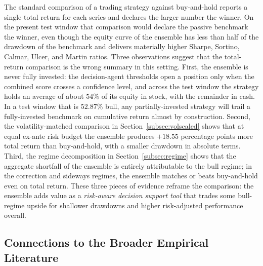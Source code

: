 \documentclass{ieeeaccess}
\newcommand{\VolScaledExcessPP}{\ensuremath{+18.55}}
\newcommand{\RegBullShare}{52.87\%}
\begin{document}
The standard comparison of a trading strategy against buy-and-hold reports a single total return for each series and declares the larger number the winner. On the present test window that comparison would declare the passive benchmark the winner, even though the equity curve of the ensemble has less than half of the drawdown of the benchmark and delivers materially higher Sharpe, Sortino, Calmar, Ulcer, and Martin ratios. Three observations suggest that the total-return comparison is the wrong summary in this setting. First, the ensemble is never fully invested: the decision-agent thresholds open a position only when the combined score crosses a confidence level, and across the test window the strategy holds an average of about $54\%$ of its equity in stock, with the remainder in cash. In a test window that is $\RegBullShare{}$ bull, any partially-invested strategy will trail a fully-invested benchmark on cumulative return almost by construction. Second, the volatility-matched comparison in Section~\ref{subsec:volscaled} shows that at equal ex-ante risk budget the ensemble produces $\VolScaledExcessPP{}$ percentage points more total return than buy-and-hold, with a smaller drawdown in absolute terms. Third, the regime decomposition in Section~\ref{subsec:regime} shows that the aggregate shortfall of the ensemble is entirely attributable to the bull regime; in the correction and sideways regimes, the ensemble matches or beats buy-and-hold even on total return. These three pieces of evidence reframe the comparison: the ensemble adds value as a \emph{risk-aware decision support tool} that trades some bull-regime upside for shallower drawdowns and higher risk-adjusted performance overall.

\subsection{Connections to the Broader Empirical Literature}
\end{document}
